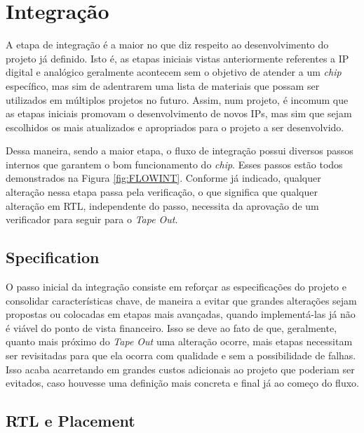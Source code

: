 \documentclass[
	12pt,				%
    oneside,			%
	a4paper,			%
	english,			%
	french,				%
	spanish,			%
	brazil				%
	]{abntex2}
\begin{document}
\section{Integração}

A etapa de integração é a maior no que diz respeito ao desenvolvimento do projeto já definido. Isto é, as etapas iniciais vistas anteriormente referentes a IP digital e analógico geralmente acontecem sem o objetivo de atender a um \textit{chip} específico, mas sim de adentrarem uma lista de materiais que possam ser utilizados em múltiplos projetos no futuro. Assim, num projeto, é incomum que as etapas iniciais promovam o desenvolvimento de novos IPs, mas sim que sejam escolhidos os mais atualizados e apropriados para o projeto a ser desenvolvido.

Dessa maneira, sendo a maior etapa, o fluxo de integração possui diversos passos internos que garantem o bom funcionamento do \textit{chip}. Esses passos estão todos demonstrados na Figura \ref{fig:FLOWINT}. Conforme já indicado, qualquer alteração nessa etapa passa pela verificação, o que significa que qualquer alteração em RTL, independente do passo, necessita da aprovação de um verificador para seguir para o \textit{Tape Out}.



\subsection{Specification}

O passo inicial da integração consiste em reforçar as especificações do projeto e consolidar características chave, de maneira a evitar que grandes alterações sejam propostas ou colocadas em etapas mais avançadas, quando implementá-las já não é viável do ponto de vista financeiro. Isso se deve ao fato de que, geralmente, quanto mais próximo do \textit{Tape Out} uma alteração ocorre, mais etapas necessitam ser revisitadas para que ela ocorra com qualidade e sem a possibilidade de falhas. Isso acaba acarretando em grandes custos adicionais ao projeto que poderiam ser evitados, caso houvesse uma definição mais concreta e final já ao começo do fluxo.

\subsection{RTL e Placement}
\end{document}
